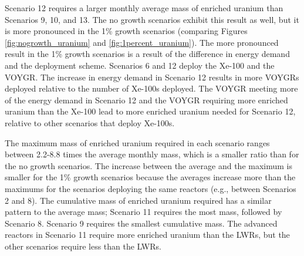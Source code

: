 Scenario 12 requires a larger monthly average mass of enriched uranium 
than Scenarios 9, 10, and 13. The no growth scenarios exhibit this result
as well, but it is more pronounced in the 1\% growth scenarios (comparing 
Figures \ref{fig:nogrowth_uranium} and \ref{fig:1percent_uranium}). 
The more pronounced result in the 1\% growth scenarios is a result of the difference 
in energy demand and the deployment scheme. Scenarios 6 and 12 deploy the 
Xe-100 and the VOYGR. The increase in energy demand in Scenario 12 results 
in more VOYGRs deployed relative to the number of Xe-100s deployed. 
The VOYGR meeting more of the energy demand in Scenario 12 and the VOYGR 
requiring more enriched uranium than the Xe-100 lead to more 
enriched uranium needed for Scenario 12, relative to other scenarios 
that deploy Xe-100s.

The maximum mass of enriched uranium required in each scenario ranges 
between 2.2-8.8 times the average monthly mass, which is a smaller ratio 
than for the no growth scenarios. The increase between 
the average and the maximum is smaller for the 1\% growth scenarios because
the averages increase more than the maximums for the scenarios deploying the 
same reactors (e.g., between Scenarios 2 and 8). The cumulative mass 
of enriched uranium required has a similar pattern to the average mass;
Scenario 11 requires the most mass, followed by Scenario 8. Scenario 
9 requires the smallest cumulative mass. 
The advanced reactors in Scenario 11 require more enriched uranium 
than the \glspl{LWR}, but the other scenarios require less than the 
\glspl{LWR}. 

 

